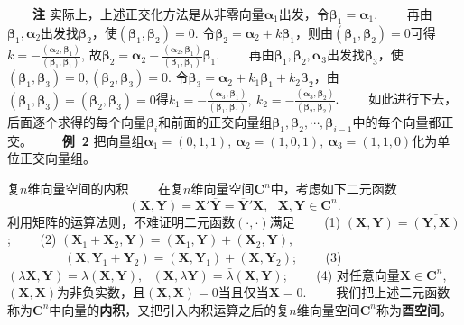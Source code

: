 \documentclass[compress,mathserif,cjk]{beamer}
\theoremstyle{remark}
\numberwithin{equation}{section}
\newcommand{\hei}{\bf}      %
\begin{document}
\begin{CJK}{UTF8}{gbsn}
\begin{frame}
\ \ \ \ {\hei 注} 实际上，上述正交化方法是从非零向量$\bm\alpha_1$出发，令$\bm\beta_1=\bm\alpha_1$.
\vskip 5pt
\ \ \ \ 再由$\bm\beta_1,\bm\alpha_2$出发找$\bm\beta_2$，使$(\bm\beta_1,\bm\beta_2)=0$. 令$\bm\beta_2=\bm\alpha_2+k\bm\beta_1$，则由$(\bm\beta_1,\bm\beta_2)=0$可得$k=-\frac{(\bm\alpha_2,\bm\beta_1)}{(\bm\beta_1,\bm\beta_1)}$, 故$\bm\beta_2=\bm\alpha_2-\frac{(\bm\alpha_2,\bm\beta_1)}{(\bm\beta_1,\bm\beta_1)}\bm\beta_1$.
\pause\vskip 5pt
\ \ \ \ 再由$\bm\beta_1,\bm\beta_2,\bm\alpha_3$出发找$\bm\beta_3$，使$(\bm\beta_1,\bm\beta_3)=0,(\bm\beta_2,\bm\beta_3)=0$. 令$\bm\beta_3=\bm\alpha_2+k_1\bm\beta_1+k_2\bm\beta_2$，由$(\bm\beta_1,\bm\beta_3)=(\bm\beta_2,\bm\beta_3)=0$得$k_1=-\frac{(\bm\alpha_3,\bm\beta_1)}{(\bm\beta_1,\bm\beta_1)},~k_2=-\frac{(\bm\alpha_3,\bm\beta_2)}{(\bm\beta_2,\bm\beta_2)}$.
\pause\vskip 5pt
\ \ \ \ 如此进行下去，后面逐个求得的每个向量$\bm\beta_i$和前面的正交向量组$\bm\beta_1,\bm\beta_2,\cdots,\bm\beta_{i-1}$中的每个向量都正交。
\pause\vskip 10pt
\ \ \ \ {\hei 例~2} 把向量组$\bm\alpha_1=(0,1,1),~\bm\alpha_2=(1,0,1),~\bm\alpha_3=(1,1,0)$化为单位正交向量组。
\end{frame}

\begin{frame}{复$n$维向量空间的内积}
\ \ \ \ 在复$n$维向量空间$\mathbf C^n$中，考虑如下二元函数
$$(\bm X,\bm Y)=\bm X'\overline{\bm Y}=\overline{\bm Y}'\bm X,~~~\bm X,\bm Y\in\mathbf C^n.$$
利用矩阵的运算法则，不难证明二元函数$(\cdot,\cdot)$满足
\vskip 5pt
\ \ \ \ (1) $(\bm X,\bm Y)=\overline{(\bm Y,\bm X)}$;
\vskip 5pt
\ \ \ \ (2) $(\bm X_1+\bm X_2,\bm Y)=(\bm X_1,\bm Y)+(\bm X_2,\bm Y),$\\
\ \ \ \ \ \ \ \ \ $(\bm X,\bm Y_1+\bm Y_2)=(\bm X,\bm Y_1)+(\bm X,\bm Y_2)$;
\vskip 5pt
\ \ \ \ (3) $(\lambda\bm X,\bm Y)=\lambda(\bm X,\bm Y),~~~(\bm X,\lambda\bm Y)=\bar\lambda(\bm X,\bm Y)$;
\vskip 5pt
\ \ \ \ (4) 对任意向量$\bm X\in\mathbf C^n$, $(\bm X,\bm X)$为非负实数，且$(\bm X,\bm X)=0$当且仅当$\bm X=0$.
\pause\vskip 5pt
\ \ \ \ 我们把上述二元函数称为$\mathbf C^n$中向量的{\hei 内积}，又把引入内积运算之后的复$n$维向量空间$\mathbf C^n$称为{\hei 酉空间}。

\end{frame}


\end{CJK}
\end{document}
